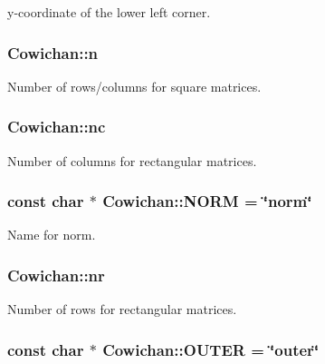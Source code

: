 y-coordinate of the lower left corner. \hypertarget{class_cowichan_10e0c7c7bcccf11869821fa03cb7a6ee}{
\subsubsection[{n}]{ {\bf Cowichan::n}}}
\label{class_cowichan_10e0c7c7bcccf11869821fa03cb7a6ee}


Number of rows/columns for square matrices. \hypertarget{class_cowichan_81d2fc0da7b4ef388a1dbf08ac820eb1}{
\subsubsection[{nc}]{ {\bf Cowichan::nc}}}
\label{class_cowichan_81d2fc0da7b4ef388a1dbf08ac820eb1}


Number of columns for rectangular matrices. \hypertarget{class_cowichan_4e2cd818307d1e806861489216e74a0f}{
\subsubsection[{NORM}]{\setlength{\rightskip}{0pt plus 5cm}const char $\ast$ {\bf Cowichan::NORM} = \char`\"{}norm\char`\"{}}}
\label{class_cowichan_4e2cd818307d1e806861489216e74a0f}


Name for norm. \hypertarget{class_cowichan_44f139040042cc616e542be6faa28672}{
\subsubsection[{nr}]{ {\bf Cowichan::nr}}}
\label{class_cowichan_44f139040042cc616e542be6faa28672}


Number of rows for rectangular matrices. \hypertarget{class_cowichan_b858724b8531751af4f611b978998be4}{
\subsubsection[{OUTER}]{\setlength{\rightskip}{0pt plus 5cm}const char $\ast$ {\bf Cowichan::OUTER} = \char`\"{}outer\char`\"{}}}
\label{class_cowichan_b858724b8531751af4f611b978998be4}


